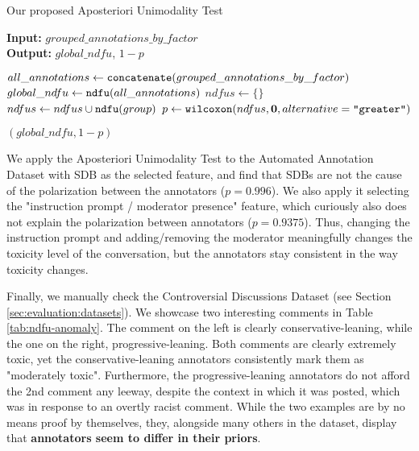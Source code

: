 \begin{algorithm}
	\caption{Our proposed Aposteriori Unimodality Test}
	\label{al:aposteriori_unimodality}
	\hspace*{\algorithmicindent} \textbf{Input:} $grouped\_annotations\_by\_factor$  \\
	\hspace*{\algorithmicindent} \textbf{Output:} $global\_ndfu$, $1 - p$ 
	\begin{algorithmic}[1]
		\State $all\_annotations \gets \texttt{concatenate}(grouped\_annotations\_by\_factor)$ 
		\State $global\_ndfu \gets \texttt{ndfu}(all\_annotations)$ 
		\State
		\State $ndfus \gets \{\}$
		\State $ndfus \gets  ndfus \cup \texttt{ndfu}(group)$ 
		\EndFor
		\State
		\State $p \gets \texttt{wilcoxon}(ndfus, \mathbf{0}, alternative=\texttt{"greater"})$
		
		\State \Return $(global\_ndfu, 1 - p)$
	\end{algorithmic}
\end{algorithm}

We apply the Aposteriori Unimodality Test to the Automated Annotation Dataset with \ac{SDB} as the selected feature, and find that \acp{SDB} are not the cause of the polarization between the annotators ($p=0.996$). We also apply it selecting the "instruction prompt / moderator presence" feature, which curiously also does not explain the polarization between annotators ($p=0.9375$). Thus, changing the instruction prompt and adding/removing the moderator meaningfully changes the toxicity level of the conversation, but the annotators stay consistent in the way toxicity changes.


Finally, we manually check the Controversial Discussions Dataset (see Section \ref{sec:evaluation:datasets}). We showcase two interesting comments in Table \ref{tab:ndfu-anomaly}. The comment on the left is clearly conservative-leaning, while the one on the right, progressive-leaning. Both comments are clearly extremely toxic, yet the conservative-leaning annotators consistently mark them as "moderately toxic". Furthermore, the progressive-leaning annotators do not afford the 2nd comment any leeway, despite the context in which it was posted, which was in response to an overtly racist comment. While the two examples are by no means proof by themselves, they, alongside many others in the dataset, display that \textbf{annotators seem to differ in their priors}.


